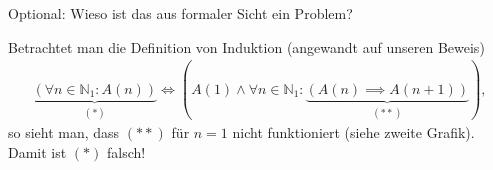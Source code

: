 {{    \alert{Optional:} Wieso ist das aus formaler Sicht ein Problem?

    Betrachtet man die Definition von Induktion (angewandt auf unseren Beweis)
    \begin{align*}
        \underbrace{(\forall n \in \mathbb{N}_1: A(n))}_{(*)} \iff (A(1) \wedge \forall n \in \mathbb{N}_1: \underbrace{(A(n) \implies A(n+1))}_{(**)}),
    \end{align*}
    so sieht man, dass $(**)$ für $n=1$ nicht funktioniert (siehe zweite Grafik). Damit ist $(*)$ falsch!
}
}
